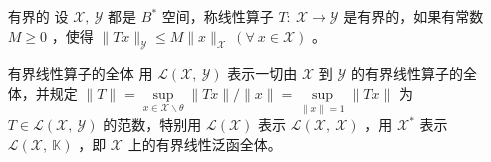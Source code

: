 \begin{enumerate}[leftmargin=2cm, label=\arabic*]
    \item[有界的] 设 $\mathscr{X},\ \mathscr{Y}$ 都是 $B^*$ 空间，称线性算子 $T:\ \mathscr{X}\to\mathscr{Y}$ 是有界的，如果有常数 $M\geqslant 0$ ，使得 $\|Tx\|_{\mathscr{Y}} \leqslant M\|x\|_{\mathscr{X}}\ (\forall\ x\in\mathscr{X})$ 。
    \item[有界线性算子的全体]用 $\mathscr{L}(\mathscr{X},\ \mathscr{Y})$ 表示一切由 $\mathscr{X}$ 到 $\mathscr{Y}$ 的有界线性算子的全体，并规定 $\|T\| = \sup\limits_{x\in\mathscr{X}\backslash\theta} \|Tx\| / \|x\| = \sup\limits_{\|x\| = 1} \|Tx\|$ 为 $T\in \mathscr{L}(\mathscr{X},\ \mathscr{Y})$ 的范数，特别用 $\mathscr{L}(\mathscr{X})$ 表示 $\mathscr{L}(\mathscr{X},\ \mathscr{X})$ ，用 $\mathscr{X}^*$ 表示 $\mathscr{L}(\mathscr{X},\ \mathbb{K})$ ，即 $\mathscr{X}$ 上的有界线性泛函全体。
\end{enumerate}

